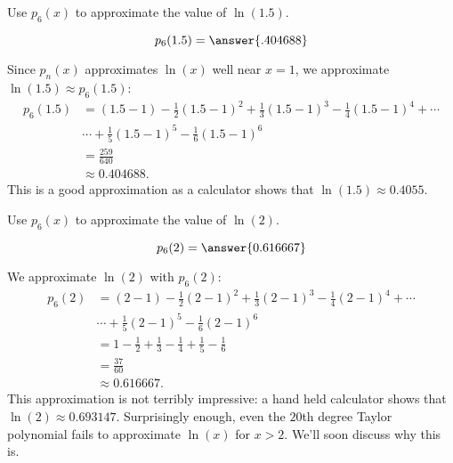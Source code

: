 \documentclass{ximera}
\begin{document}
\begin{question}
  Use $p_6(x)$ to approximate the value of $\ln(1.5)$.
  \begin{prompt}
    \[
    p_6(1.5) = \answer{.404688}
    \]
  \end{prompt}
  \begin{hint}
    Since $p_n(x)$ approximates $\ln(x)$ well near $x=1$, we approximate
    $\ln(1.5) \approx p_6(1.5)$:
    \begin{align*}
      p_6(1.5) &= (1.5-1)-\frac12(1.5-1)^2+\frac13(1.5-1)^3-\frac14(1.5-1)^4+\cdots \\
      &\cdots +\frac15(1.5-1)^5-\frac16(1.5-1)^6\\
      &=\frac{259}{640}\\
      &\approx 0.404688.
    \end{align*}
    This is a good approximation as a calculator shows that $\ln(1.5)
    \approx 0.4055.$
  \end{hint}
  \begin{question}
    Use $p_6(x)$ to approximate the value of $\ln(2)$.
    \begin{prompt} 
      \[
      p_6(2) = \answer{0.616667}
      \]
    \end{prompt}
    \begin{hint}
      We approximate $\ln(2)$ with $ p_6(2)$:
      \begin{align*}
        p_6(2) &= (2-1)-\frac12(2-1)^2+\frac13(2-1)^3-\frac14(2-1)^4+\cdots \\
        &\cdots +\frac15(2-1)^5-\frac16(2-1)^6\\
        &=	1-\frac12+\frac13-\frac14+\frac15-\frac16 \\
        &= \frac{37}{60}\\ 
        &\approx 0.616667.
      \end{align*}
      This approximation is not terribly impressive: a hand held
      calculator shows that $\ln(2) \approx 0.693147$. Surprisingly
      enough, even the $20$th degree Taylor polynomial fails to
      approximate $\ln(x)$ for $x>2$. We'll soon discuss why this is.
    \end{hint}
  \end{question}
\end{question}
\end{document}
